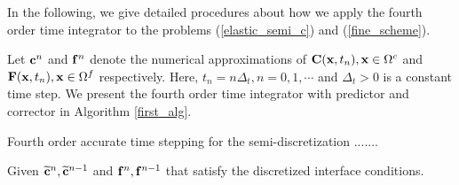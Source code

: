 In the following, we give detailed procedures about how we apply the fourth order time integrator to the problems (\ref{elastic_semi_c}) and  (\ref{fine_scheme}). 

Let ${\bf c}^{n}$ and ${\bf f}^{n}$ denote the numerical approximations of ${\bf C}({\bf x},t_n), {\bf x}\in\Omega^c$ and ${\bf F}({\bf x},t_n), {\bf x}\in\Omega^f$ respectively. Here, $t_n = n\Delta_t, n = 0,1,\cdots$ and $\Delta_t > 0$ is a constant time step. We present the fourth order time integrator with predictor and corrector in  Algorithm \ref{first_alg}.
~\\
\begin{breakablealgorithm}
	\caption{Fourth order accurate time stepping for the semi-discretization .......}\label{first_alg}
	Given  $\widetilde{{\bf c}}^{n}, \widetilde{{\bf c}}^{n-1}$ and ${\bf f}^{n}, {\bf f}^{n-1}$ that satisfy the discretized interface conditions.
	

\end{breakablealgorithm}
